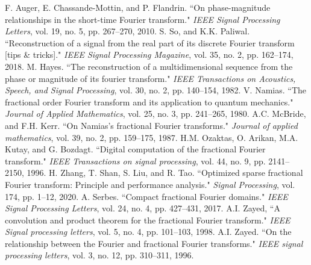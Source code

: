 \documentclass[journal]{IEEEtran}
\begin{document}
%
%
%
\begin{thebibliography}{1}


F. Auger, E. Chassande-Mottin, and P. Flandrin. ``On phase-magnitude relationships in the short-time Fourier transform." \emph{IEEE Signal Processing Letters}, vol. 19, no. 5, pp. 267--270, 2010.
S. So, and K.K. Paliwal. ``Reconstruction of a signal from the real part of its discrete Fourier transform [tips \& tricks]." \emph{IEEE Signal Processing Magazine}, vol. 35, no. 2, pp. 162--174, 2018.
M. Hayes. ``The reconstruction of a multidimensional sequence from the phase or magnitude of its fourier transform." \emph{IEEE Transactions on Acoustics, Speech, and Signal Processing}, vol. 30, no. 2, pp. 140--154, 1982.
V. Namias. ``The fractional order Fourier transform and its application to quantum mechanics." \emph{Journal of Applied Mathematics}, vol. 25, no. 3, pp. 241--265, 1980.
 A.C. McBride, and F.H. Kerr. ``On Namias's fractional Fourier transforms." \emph{Journal of applied mathematics}, vol. 39, no. 2, pp. 159--175, 1987.
H.M. Ozaktas, O. Arikan, M.A. Kutay, and G. Bozdagt. ``Digital computation of the fractional Fourier transform." \emph{IEEE Transactions on signal processing}, vol. 44, no. 9, pp. 2141--2150, 1996.
H. Zhang, T. Shan, S. Liu, and R. Tao. ``Optimized sparse fractional Fourier transform: Principle and performance analysis." \emph{Signal Processing}, vol. 174, pp. 1--12, 2020.
A. Serbes. ``Compact fractional Fourier domains." \emph{IEEE Signal Processing Letters}, vol. 24, no. 4, pp. 427--431, 2017.
A.I. Zayed, ``A convolution and product theorem for the fractional Fourier transform." \emph{IEEE Signal processing letters}, vol. 5, no. 4, pp. 101--103, 1998.
A.I. Zayed. ``On the relationship between the Fourier and fractional Fourier transforms." \emph{IEEE signal processing letters}, vol. 3, no. 12, pp. 310--311, 1996.

\end{thebibliography}
\end{document}
